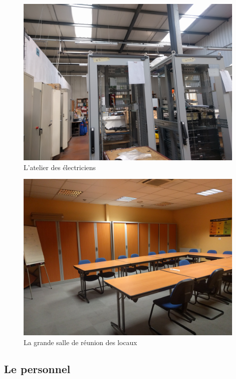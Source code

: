\documentclass[a4paper]{article}
\begin{document}
    \begin{figure}[H]
        \centering
        \includegraphics[scale=0.065]{img/atelier}
        \caption{L'atelier des électriciens}
    \end{figure}
    \begin{figure}[H]
        \centering
        \includegraphics[scale=0.065]{img/salleReu}
        \caption{La grande salle de réunion des locaux}
    \end{figure}


    \subsection{Le personnel}
\end{document}
